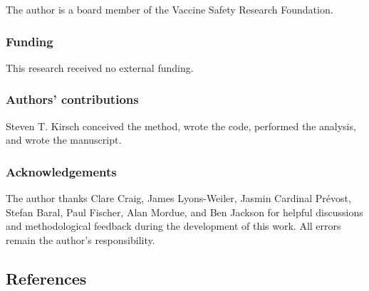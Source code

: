 \documentclass[
]{article}
\begin{document}
The author is a board member of the Vaccine Safety Research Foundation.

\subsubsection{Funding}\label{funding}

This research received no external funding.

\subsubsection{Authors' contributions}\label{authors-contributions}

Steven T. Kirsch conceived the method, wrote the code, performed the
analysis, and wrote the manuscript.

\subsubsection{Acknowledgements}\label{acknowledgements}

The author thanks Clare Craig, James Lyons-Weiler, Jasmin Cardinal
Prévost, Stefan Baral, Paul Fischer, Alan Mordue, and Ben Jackson for
helpful discussions and methodological feedback during the development
of this work. All errors remain the author's responsibility.

\newpage

\subsection{References}\label{references}
\end{document}
